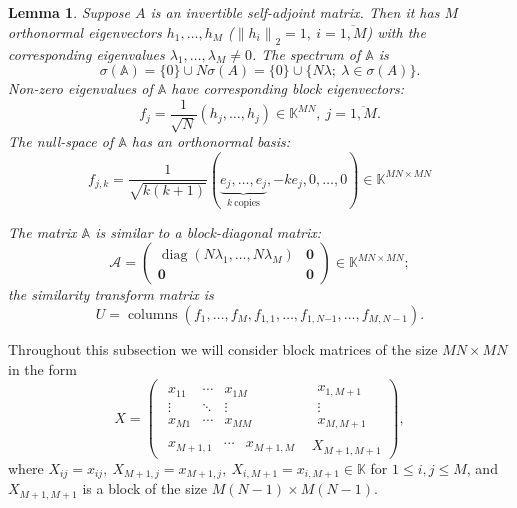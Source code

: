 \documentclass[a4paper]{article}
\newtheorem{lem}{Lemma}
\theoremstyle{definition}
\begin{document}
\begin{lem}
    Suppose \( A \) is an invertible self-adjoint matrix.
    Then it has \( M \) orthonormal eigenvectors \( h_1, \ldots, h_M \)
    (\(\left\|h_i\right\|_2 = 1,\ i{=}\overline{1,M}\))
    with the corresponding eigenvalues
    \( \lambda_1, \ldots, \lambda_M \neq 0\).
    The spectrum of \( \mathbb{A} \) is
    \[
        \sigma(\mathbb{A}) = \{0\}\cup N\sigma(A) = \{0\} \cup \{N\lambda;\ \lambda\in\sigma(A) \}.
    \]
    Non-zero eigenvalues of \( \mathbb{A} \)
        have corresponding block eigenvectors:
    \[
        f_j = \frac{1}{\sqrt{N}} (h_j, \ldots, h_j)\in \mathbb{K}^{MN},\ j=\overline{1,M}.
    \]
    The null-space of \( \mathbb{A} \)
        has an orthonormal basis:
    \[
        f_{j,k} = \frac{1}{\sqrt{k(k+1)}}
        (
        \underbrace{e_j, \ldots, e_j}_{k\ \text{copies}},
        -ke_j,
        0, \ldots, 0
        ) \in\mathbb{K}^{{MN}{\times}{MN}}
    \]

    The matrix \( \mathbb{A} \) is similar to a block-diagonal matrix:
    \[
        \mathcal{A} =
        \left(\begin{array}{c|c}
            \operatorname{diag}(N\lambda_1,\ldots,N\lambda_M) & \mathbf{0} \\ \hline
            \mathbf{0} & \mathbf{0}
        \end{array}\right)\in\mathbb{K}^{{MN}{\times}{MN}};
    \]
    the similarity transform matrix is
    \[
        U = \operatorname{columns}
        \left(f_1, \ldots, f_M, f_{1,1}, \ldots, f_{1,N{-1}}, \ldots, f_{M,N{-}1}\right).
    \]
\end{lem}

Throughout this subsection
    we will consider block matrices
    of the size \( {MN}{\times}{MN} \)
    in the form
    \[
    X =
        \left(\begin{array}{c|c}
            \begin{matrix}
                x_{11} & \cdots & x_{1M} \\
                \vdots & \ddots & \vdots \\
                x_{M1} & \cdots & x_{MM}
            \end{matrix} &
            \begin{matrix}
                x_{1,M+1} \\
                \vdots \\
                x_{M,M+1}
            \end{matrix} \\ \hline
            \begin{matrix}
                x_{M+1,1} &
                \cdots &
                x_{M+1,M}
            \end{matrix} &
            X_{M+1,M+1}
        \end{array}\right),
    \]
where
\( X_{ij}      {=} x_{ij},
 \ X_{M{+}1,j} {=} x_{M{+}1,j},
 \ X_{i,M{+}1} {=} x_{i,M{+}1} \in \mathbb{K} \)
for \( 1 \leq {i,j} \leq M \),
and
\( X_{M{+}1,M{+}1} \) is a block of the size \( {M(N{-}1){\times}M(N-1)} \).
\end{document}
